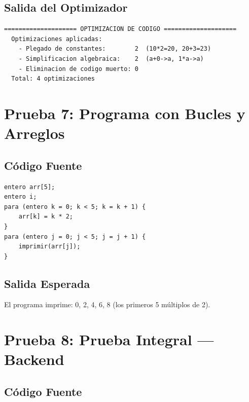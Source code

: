 \subsection{Salida del Optimizador}

\begin{verbatim}
==================== OPTIMIZACION DE CODIGO ====================
  Optimizaciones aplicadas:
    - Plegado de constantes:        2  (10*2=20, 20+3=23)
    - Simplificacion algebraica:    2  (a+0->a, 1*a->a)
    - Eliminacion de codigo muerto: 0
  Total: 4 optimizaciones
\end{verbatim}


\section{Prueba 7: Programa con Bucles y Arreglos}

\subsection{Código Fuente}

\begin{lstlisting}[style=tppstyle, caption={Programa con arreglo y bucle para}]
entero arr[5];
entero i;
para (entero k = 0; k < 5; k = k + 1) {
    arr[k] = k * 2;
}
para (entero j = 0; j < 5; j = j + 1) {
    imprimir(arr[j]);
}
\end{lstlisting}

\subsection{Salida Esperada}

El programa imprime: 0, 2, 4, 6, 8 (los primeros 5 múltiplos de 2).


\section{Prueba 8: Prueba Integral — Backend}

\subsection{Código Fuente}

